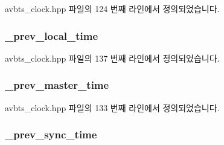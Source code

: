 avbts\+\_\+clock.\+hpp 파일의 124 번째 라인에서 정의되었습니다.

\subsubsection[{\texorpdfstring{\+\_\+prev\+\_\+local\+\_\+time}{_prev_local_time}}]{ \+\_\+prev\+\_\+local\+\_\+time\hspace{0.3cm}{\ttfamily [private]}}\hypertarget{class_i_e_e_e1588_clock_a6f5e345b7156222b4c38108c4e98823f}{}\label{class_i_e_e_e1588_clock_a6f5e345b7156222b4c38108c4e98823f}


avbts\+\_\+clock.\+hpp 파일의 137 번째 라인에서 정의되었습니다.

\subsubsection[{\texorpdfstring{\+\_\+prev\+\_\+master\+\_\+time}{_prev_master_time}}]{ \+\_\+prev\+\_\+master\+\_\+time\hspace{0.3cm}{\ttfamily [private]}}\hypertarget{class_i_e_e_e1588_clock_a63a3a60d4d184a1255e92d9c881ba81b}{}\label{class_i_e_e_e1588_clock_a63a3a60d4d184a1255e92d9c881ba81b}


avbts\+\_\+clock.\+hpp 파일의 133 번째 라인에서 정의되었습니다.

\subsubsection[{\texorpdfstring{\+\_\+prev\+\_\+sync\+\_\+time}{_prev_sync_time}}]{ \+\_\+prev\+\_\+sync\+\_\+time\hspace{0.3cm}{\ttfamily [private]}}\hypertarget{class_i_e_e_e1588_clock_af8fc87788a60f7d64b3172beb18e3b45}{}\label{class_i_e_e_e1588_clock_af8fc87788a60f7d64b3172beb18e3b45}


